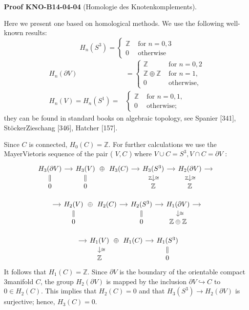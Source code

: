 \documentclass[10pt, letterpaper]{article}
\newcommand{\CustomHeading}[3]{%
  \par\medskip\noindent%
  \textbf{#1 #2} \textnormal{(#3)}.\enskip%
}
\newenvironment{PROOF}[2]{\CustomHeading{Proof}{#1}{#2}}{}
\begin{document}
\begin{PROOF}{KNO-B14-04-04}{Homologie des Knotenkomplements}
Here we present one based on homological methods. We use the following well-known results:
$$
H_{n}\left(S^{3}\right)= \begin{cases}\mathbb{Z} & \text { for } n=0,3 \\ 0 & \text { otherwise }\end{cases}
$$
$$
\begin{aligned}
H_{n}(\partial V) & = \begin{cases}\mathbb{Z} & \text { for } n=0,2 \\
\mathbb{Z} \oplus \mathbb{Z} & \text { for } n=1, \\
0 & \text { otherwise, }\end{cases} \\
H_{n}(V)=H_{n}\left(S^{1}\right)= & \begin{cases}\mathbb{Z} & \text { for } n=0,1, \\
0 & \text { otherwise; }\end{cases}
\end{aligned}
$$
they can be found in standard books on algebraic topology, see Spanier [341], StöckerZieschang [346], Hatcher [157].

Since $C$ is connected, $H_{0}(C)=\mathbb{Z}$. For further calculations we use the MayerVietoris sequence of the pair ( $V, C$ ) where $V \cup C=S^{3}, V \cap C=\partial V$ :
\[
\begin{tikzcd}[row sep=small, column sep=small]
H_3(\partial V) \arrow[r] \arrow[d, equal] 
  & H_3(V) \arrow[r, phantom, "\oplus"] \arrow[d, equal] 
  & H_3(C) \arrow[r] 
  & H_3(S^3) \arrow[r] \arrow[d, "\cong", "\mathbb{Z}"']
  & H_2(\partial V) \arrow[r] \arrow[d, "\cong", "\mathbb{Z}"'] 
  & {} \\
0 & 0 & {} & \mathbb{Z} & \mathbb{Z} & {}
\end{tikzcd}
\]

\[
\begin{tikzcd}[row sep=small, column sep=small]
{} \arrow[r]
  & H_2(V) \arrow[r, phantom, "\oplus"] \arrow[d, equal]
  & H_2(C) \arrow[r] 
  & H_2(S^3) \arrow[r] \arrow[d, equal]
  & H_1(\partial V) \arrow[r] \arrow[d, "\cong"]
  & {} \\
{} & 0 & {}& 0 & \mathbb{Z} \oplus \mathbb{Z} & {}
\end{tikzcd}
\]

\[
\begin{tikzcd}[row sep=small, column sep=small]
{} \arrow[r] 
  & H_1(V) \arrow[r, phantom, "\oplus"] \arrow[d, "\cong"] & H_1(C) \arrow[r]
  & H_1(S^3) \arrow[d, equal] \\
{} & \mathbb{Z} & {} & 0
\end{tikzcd}
\]
It follows that $H_{1}(C)=\mathbb{Z}$. Since $\partial V$ is the boundary of the orientable compact 3manifold $C$, the group $H_{2}(\partial V)$ is mapped by the inclusion $\partial V \hookrightarrow C$ to $0 \in H_{2}(C)$. This implies that $H_{2}(C)=0$ and that $H_{3}\left(S^{3}\right) \rightarrow H_{2}(\partial V)$ is surjective; hence, $H_{3}(C)=0$.



\end{PROOF}
\end{document}
